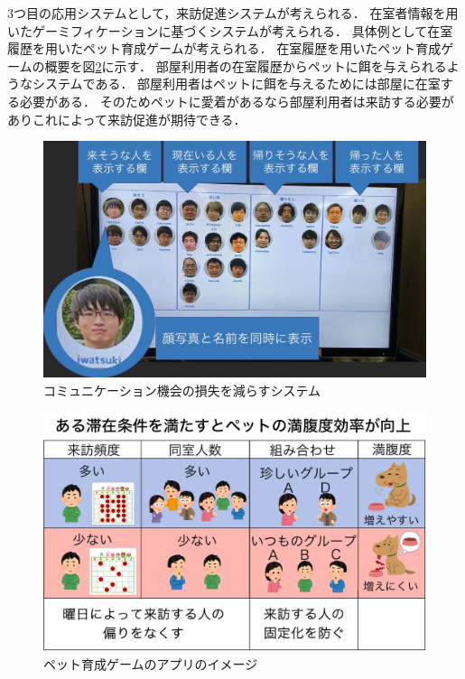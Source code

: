 3つ目の応用システムとして，来訪促進システムが考えられる．
在室者情報を用いたゲーミフィケーションに基づくシステムが考えられる．
具体例として在室履歴を用いたペット育成ゲームが考えられる．
在室履歴を用いたペット育成ゲームの概要を図\ref{petgaiyou}に示す．
部屋利用者の在室履歴からペットに餌を与えられるようなシステムである．
部屋利用者はペットに餌を与えるためには部屋に在室する必要がある．
そのためペットに愛着があるなら部屋利用者は来訪する必要がありこれによって来訪促進が期待できる．
\begin{figure}[H]
  \begin{center}
    \includegraphics[width=160mm]{image/todayStay.jpg}
    \caption{コミュニケーション機会の損失を減らすシステム}
    \label{todayStay}
  \end{center}
\end{figure}

\begin{figure}[H]
  \begin{center}
    \includegraphics[width=160mm]{image/petgaiyou.pdf}
    \caption{ペット育成ゲームのアプリのイメージ}
    \label{petgaiyou}
  \end{center}
\end{figure}

\thispagestyle{myheadings}
